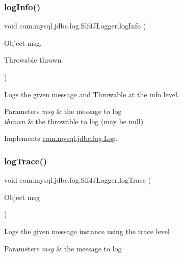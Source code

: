 \subsubsection{\texorpdfstring{log\+Info()}{logInfo()}\hspace{0.1cm}{\footnotesize\ttfamily [2/2]}}
{\footnotesize\ttfamily void com.\+mysql.\+jdbc.\+log.\+Slf4\+J\+Logger.\+log\+Info (\begin{DoxyParamCaption}\item[{Object}]{msg,  }\item[{Throwable}]{thrown }\end{DoxyParamCaption})}

Logs the given message and Throwable at the \textquotesingle{}info\textquotesingle{} level.


\begin{DoxyParams}{Parameters}
{\em msg} & the message to log \\
\hline
{\em thrown} & the throwable to log (may be null) \\
\hline
\end{DoxyParams}


Implements \mbox{\hyperlink{interfacecom_1_1mysql_1_1jdbc_1_1log_1_1_log_a577190d2919e07471dcd29d57eebee30}{com.\+mysql.\+jdbc.\+log.\+Log}}.

\mbox{\label{classcom_1_1mysql_1_1jdbc_1_1log_1_1_slf4_j_logger_ae3f7e3b7c4ec00f13fa13e67ce26f471}} 
\subsubsection{\texorpdfstring{log\+Trace()}{logTrace()}\hspace{0.1cm}{\footnotesize\ttfamily [1/2]}}
{\footnotesize\ttfamily void com.\+mysql.\+jdbc.\+log.\+Slf4\+J\+Logger.\+log\+Trace (\begin{DoxyParamCaption}\item[{Object}]{msg }\end{DoxyParamCaption})}

Logs the given message instance using the \textquotesingle{}trace\textquotesingle{} level


\begin{DoxyParams}{Parameters}
{\em msg} & the message to log \\
\hline
\end{DoxyParams}


